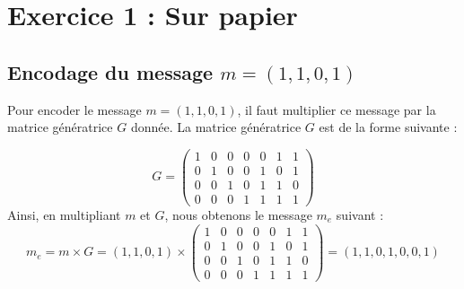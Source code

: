 \section{Exercice 1 : Sur papier}
\subsection{Encodage du message $m=(1,1,0,1)$}
Pour encoder le message $m=(1,1,0,1)$, il faut multiplier ce message par la matrice génératrice $G$ donnée. La matrice génératrice $G$ est de la forme suivante :

\begin{equation}
 G=
\begin{pmatrix}
    1 & 0 & 0 & 0 & 0 & 1 & 1 \\
    0 & 1 & 0 & 0 & 1 & 0 & 1 \\
    0 & 0 & 1 & 0 & 1 & 1 & 0 \\
    0 & 0 & 0 & 1 & 1 & 1 & 1
   \end{pmatrix}
\end{equation}
Ainsi, en multipliant $m$ et $G$, nous obtenons le message $m_e$ suivant :
\begin{equation}
 m_e=m\times G=(1,1,0,1)\times
 \begin{pmatrix}
    1 & 0 & 0 & 0 & 0 & 1 & 1 \\
    0 & 1 & 0 & 0 & 1 & 0 & 1 \\
    0 & 0 & 1 & 0 & 1 & 1 & 0 \\
    0 & 0 & 0 & 1 & 1 & 1 & 1
   \end{pmatrix}
   =(1,1,0,1,0,0,1)
\end{equation}
